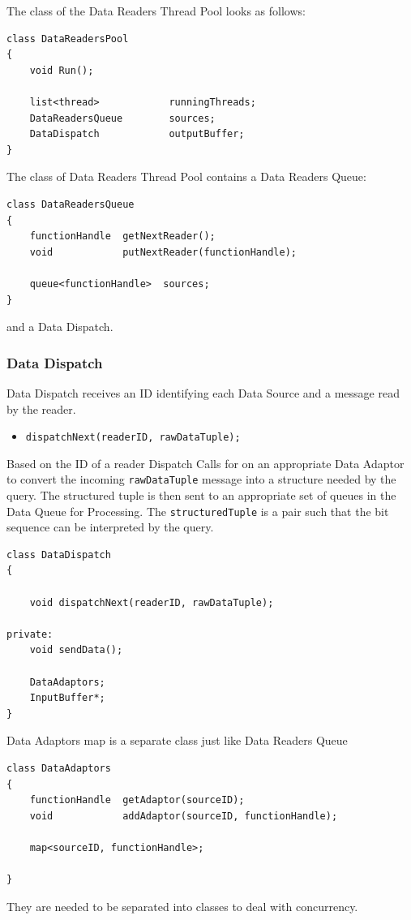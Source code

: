 \documentclass[11pt]{article}
\begin{document}
The class of the Data Readers Thread Pool looks as follows:
\begin{verbatim}
class DataReadersPool
{
	void Run();
	
    list<thread>            runningThreads;
    DataReadersQueue        sources;
    DataDispatch            outputBuffer;
}
\end{verbatim}

\noindent The class of Data Readers Thread Pool contains a Data Readers Queue:

\begin{verbatim}
class DataReadersQueue
{
	functionHandle  getNextReader();
	void            putNextReader(functionHandle);
	
    queue<functionHandle>  sources;
}
\end{verbatim}

\noindent and a Data Dispatch.

\subsubsection{Data Dispatch}

Data Dispatch receives an ID identifying each Data Source and a message read by the reader. 

\begin{itemize}
	\item {\tt dispatchNext(readerID, rawDataTuple);}
\end{itemize}

Based on the ID of a reader Dispatch Calls for on an appropriate Data Adaptor to convert the incoming {\tt rawDataTuple} message into a structure needed by the query. The structured tuple is then sent to an appropriate set of queues in the Data Queue for Processing. The {\tt structuredTuple} is a pair {\tt <size, bit-sequence>} such that the bit sequence can be interpreted by the query. 

\begin{verbatim}
class DataDispatch
{
	
	void dispatchNext(readerID, rawDataTuple);

private:
    void sendData();
	
    DataAdaptors;
    InputBuffer*;
}
\end{verbatim}

\noindent Data Adaptors map is a separate class just like Data Readers Queue

\begin{verbatim}
class DataAdaptors
{
    functionHandle  getAdaptor(sourceID);
    void            addAdaptor(sourceID, functionHandle);

    map<sourceID, functionHandle>;
	
}
\end{verbatim}
\noindent They are needed to be separated into classes to deal with concurrency.
\end{document}
